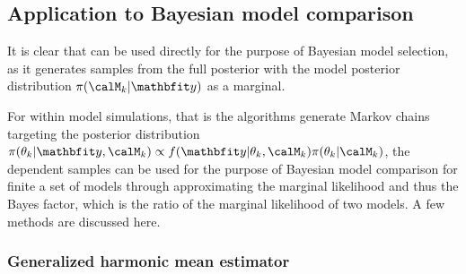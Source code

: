 \subsection{Application to Bayesian model comparison}
\label{sub:MCMC Application to Bayesian model comparison}

It is clear that \rjmcmc can be used directly for the purpose of Bayesian
model selection, as it generates samples from the full posterior with the
model posterior distribution $\pi(\calM_k|\data)$ as a marginal.

For within model simulations, that is the algorithms generate Markov chains
targeting the posterior distribution $\pi(\theta_k|\data,\calM_k) \propto
f(\data|\theta_k,\calM_k)\pi(\theta_k|\calM_k)$, the dependent samples can be
used for the purpose of Bayesian model comparison for finite a set of models
through approximating the marginal likelihood and thus the Bayes factor, which
is the ratio of the marginal likelihood of two models. A few methods are
discussed here.

\subsubsection{Generalized harmonic mean estimator}
\label{ssub:Generalized harmonic mean estimator}


